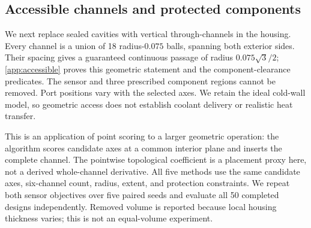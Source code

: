 \subsection{Accessible channels and protected components}
\label{sec:accessible}
We next replace sealed cavities with vertical through-channels in the
housing. Every channel is a union of 18 radius-$0.075$ balls, spanning
both exterior sides. Their spacing gives a guaranteed continuous
passage of radius $0.075\sqrt{3}/2$; \cref{app:accessible} proves this
geometric statement and the component-clearance predicates. The
sensor and three prescribed component regions cannot be removed.
Port positions vary with the selected axes. We retain the ideal cold-wall
model, so geometric access does not establish coolant delivery or
realistic heat transfer.

This is an application of point scoring to a larger geometric operation:
the algorithm scores candidate axes at a common interior plane and
inserts the complete channel. The pointwise topological coefficient
is a placement proxy here, not a derived whole-channel derivative.
All five methods use the same candidate axes, six-channel count,
radius, extent, and protection constraints. We repeat both sensor
objectives over five paired seeds and evaluate all 50 completed
designs independently. Removed volume is reported because local
housing thickness varies; this is not an equal-volume experiment.




